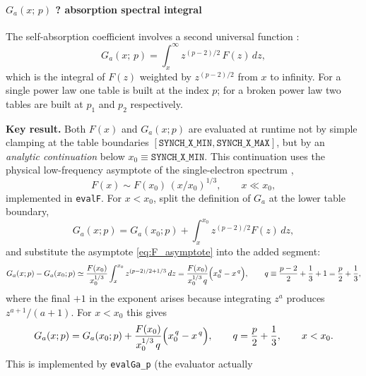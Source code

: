 \documentclass[12pt,a4paper]{article}
\newcommand{\code}[1]{\texttt{#1}}
\newcommand{\raikou}{\textsc{Raikou}}
\newenvironment{keyresult}{%
	\begin{framed}\noindent\textbf{Key result.}\quad}
	{\end{framed}}
\begin{document}
\paragraph{\texorpdfstring{$G_a(x;\,p)$}{Ga(x,p)} ? absorption spectral
	integral}
\label{sec:Ga}

The self-absorption coefficient involves a second universal function
\citep[\raikou{} Eq.~C3]{kawashima2023}:
\begin{equation}
	G_a(x;\,p) = \int_x^{\infty} z^{(p-2)/2}\,F(z)\,dz,
	\label{eq:Ga}
\end{equation}
which is the integral of $F(z)$ weighted by $z^{(p-2)/2}$ from $x$ to
infinity.  For a single power law one table is built at the index $p$; for a
broken power law two tables are built at $p_1$ and $p_2$ respectively.

\begin{keyresult}
	Both $F(x)$ and $G_a(x;p)$ are evaluated at runtime not by simple
	clamping at the table boundaries $[\code{SYNCH\_X\_MIN},
	\code{SYNCH\_X\_MAX}]$, but by an \emph{analytic continuation} below
	$x_0\equiv\code{SYNCH\_X\_MIN}$. This continuation uses the physical
	low-frequency asymptote of the single-electron spectrum
	\citep[R\&L79 Eq.~6.31b]{rybicki1979},
	\begin{equation}
		F(x) \sim F(x_0)\,(x/x_0)^{1/3}, \qquad x \ll x_0,
		\label{eq:F_asymptote}
	\end{equation}
	implemented in \code{evalF}. For $x<x_0$, split the definition of
	$G_a$ at the lower table boundary,
	\begin{equation}
		G_a(x;p)
		=
		G_a(x_0;p)
		+
		\int_x^{x_0} z^{(p-2)/2}F(z)\,dz,
	\end{equation}
	and substitute the asymptote \eqref{eq:F_asymptote} into the added
	segment:
	\begin{equation}
		G_a(x;p)-G_a(x_0;p)
		\simeq
		\frac{F(x_0)}{x_0^{1/3}}
		\int_x^{x_0} z^{(p-2)/2+1/3}\,dz
		=
		\frac{F(x_0)}{x_0^{1/3}\,q}
		\Bigl(x_0^{\,q}-x^{\,q}\Bigr),
		\qquad
		q \equiv \frac{p-2}{2}+\frac13+1=\frac{p}{2}+\frac13,
		\label{eq:Ga_extension}
	\end{equation}
	where the final $+1$ in the exponent arises because integrating
	$z^{a}$ produces $z^{a+1}/(a+1)$. For $x<x_0$ this gives
	\begin{equation}
		G_a(x;p) = G_a(x_0;p)
		+ \frac{F(x_0)}{x_0^{1/3}\,q}\Bigl(x_0^{\,q} - x^{\,q}\Bigr),
		\qquad q = \frac{p}{2}+\frac13,
		\qquad x < x_0.
	\end{equation}
	This is implemented by \code{evalGa\_p} (the evaluator actually

\end{keyresult}
\end{document}
